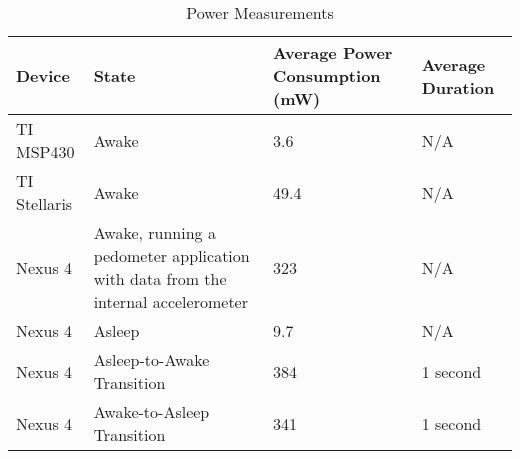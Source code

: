 \begin{table*}[t]
\begin{tabular}{| l | p{7cm} | l | l |}
    \hline
    Device & State & Average Power Consumption (mW) & Average Duration \\ \hline
    TI MSP430 & Awake & 3.6 & N/A \\ \hline
    TI Stellaris & Awake & 49.4 & N/A \\ \hline
    Nexus 4 & Awake, running a pedometer application with data from the internal accelerometer & 323 & N/A \\ \hline
    Nexus 4 & Asleep & 9.7 & N/A \\ \hline
    Nexus 4 & Asleep-to-Awake Transition & 384 & 1 second \\ \hline
    Nexus 4 & Awake-to-Asleep Transition & 341 & 1 second \\ \hline
\end{tabular}
\caption{Power Measurements}
\label{table:powerMeasurements}
\end{table*}